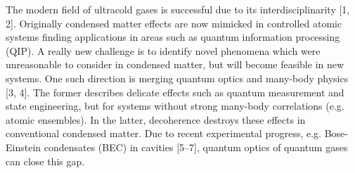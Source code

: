 The modern field of ultracold gases is successful due to its
interdisciplinarity [1, 2]. Originally condensed matter effects are
now mimicked in controlled atomic systems finding applications in
areas such as quantum information processing (QIP). A really new
challenge is to identify novel phenomena which were unreasonable to
consider in condensed matter, but will become feasible in new systems.
One such direction is merging quantum optics and many-body physics [3,
  4]. The former describes delicate effects such as quantum
measurement and state engineering, but for systems without strong
many-body correlations (e.g. atomic ensembles).  In the latter,
decoherence destroys these effects in conventional condensed
matter. Due to recent experimental progress, e.g. Bose-Einstein
condensates (BEC) in cavities [5–7], quantum optics of quantum gases
can close this gap.
